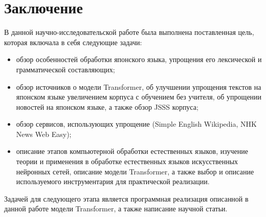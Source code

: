 \chapter*{Заключение} \label{ch-conclusion}

В данной научно-исследовательской работе была выполнена поставленная цель, которая включала в себя следующие задачи:
\begin{itemize}%
  \item обзор особенностей обработки японского языка, упрощения его лексической и грамматической составляющих;
  \item обзор источников о модели Transformer, об улучшении упрощения текстов на японском языке увеличением корпуса с обучением без учителя, об упрощении новостей на японском языке, а также обзор JSSS корпуса;
  \item обзор сервисов, использующих упрощение (Simple English Wikipedia, NHK News Web Easy);
  \item описание этапов компьютерной обработки естественных языков, изучение теории и применения в обработке естественных языков искусственных нейронных сетей, описание модели Transformer, а также выбор и описание используемого инструментария для практической реализации.
\end{itemize}

Задачей для следующего этапа является программная реализация описанной в данной работе модели Transformer, а также написание научной статьи.
